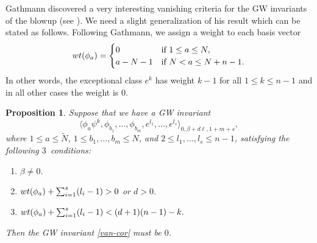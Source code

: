 \documentclass[10pt,a4paper]{article}
\numberwithin{equation}{section}
\newtheorem{Proposition}[Theorem]{Proposition}
\begin{document}
Gathmann discovered a very interesting vanishing criteria for the GW
invariants of the blowup (see \cite{Gat}). We need a slight generalization of his
result which can be stated as follows. Following Gathmann, we
assign a weight to each basis vector
\[
{\rm wt}(\phi_a) = \begin{cases}
 0 & \mbox{if } 1\leq a\leq N,\\
 a-N-1 & \mbox{if } N<a\leq N+n-1.
\end{cases}
\]
In other words, the exceptional class $e^k$ has weight $k-1$ for all
$1\leq k\leq n-1$ and in all other cases the weight is $0$.
\begin{Proposition}\label{prop:van}
Suppose that we have a GW invariant
\begin{equation}\label{van-cor}
\big\langle \phi_a \psi^k,
\phi_{b_1},\dots,\phi_{b_m},
e^{l_1},\dots, e^{l_s}
\big\rangle_{0,\beta+ d\ell, 1+m+s},
\end{equation}
where $1\leq a\leq \widetilde{N}$, $1\leq b_1,\dots,b_m\leq N$, and
$2\leq l_1,\dots,l_s\leq n-1$, satisfying the following $3$~conditions:
\begin{enumerate}\itemsep=0pt
\item[$(i)$]
 $\beta\neq 0$.
\item[$(ii)$]
 ${\rm wt}(\phi_a)+ \sum_{i=1}^s (l_i-1) >0$ or $d>0$.
\item[$(iii)$]
 ${\rm wt}(\phi_a)+ \sum_{i=1}^s (l_i-1) < (d+1)(n-1)-k.$
\end{enumerate}
Then the GW invariant \eqref{van-cor} must be $0$.
\end{Proposition}
\end{document}
